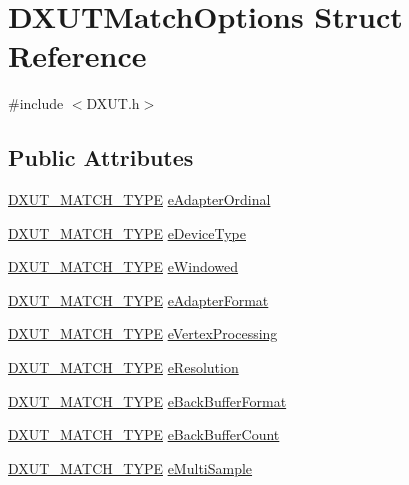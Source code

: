 \hypertarget{struct_d_x_u_t_match_options}{
\section{DXUTMatchOptions Struct Reference}
\label{struct_d_x_u_t_match_options}
}


{\ttfamily \#include $<$DXUT.h$>$}\subsection*{Public Attributes}
\begin{DoxyCompactItemize}
\item 
\hyperlink{_d_x_u_t_8h_aaa7d287a94f58c93d67a7ec6b4cb0ee3}{DXUT\_\-MATCH\_\-TYPE} \hyperlink{struct_d_x_u_t_match_options_a9b69428656c849fb6f826cef8cab5398}{eAdapterOrdinal}
\item 
\hyperlink{_d_x_u_t_8h_aaa7d287a94f58c93d67a7ec6b4cb0ee3}{DXUT\_\-MATCH\_\-TYPE} \hyperlink{struct_d_x_u_t_match_options_ae5673ce0d36d4977884ce5704a911393}{eDeviceType}
\item 
\hyperlink{_d_x_u_t_8h_aaa7d287a94f58c93d67a7ec6b4cb0ee3}{DXUT\_\-MATCH\_\-TYPE} \hyperlink{struct_d_x_u_t_match_options_a4a90a47a97650abaae05c545c9ca3c8e}{eWindowed}
\item 
\hyperlink{_d_x_u_t_8h_aaa7d287a94f58c93d67a7ec6b4cb0ee3}{DXUT\_\-MATCH\_\-TYPE} \hyperlink{struct_d_x_u_t_match_options_ac803d477036feafabca327cecc8c02e3}{eAdapterFormat}
\item 
\hyperlink{_d_x_u_t_8h_aaa7d287a94f58c93d67a7ec6b4cb0ee3}{DXUT\_\-MATCH\_\-TYPE} \hyperlink{struct_d_x_u_t_match_options_a8322f0f64497c18263cab5a04d039ffb}{eVertexProcessing}
\item 
\hyperlink{_d_x_u_t_8h_aaa7d287a94f58c93d67a7ec6b4cb0ee3}{DXUT\_\-MATCH\_\-TYPE} \hyperlink{struct_d_x_u_t_match_options_acd2bd323152531f584f35196daef968b}{eResolution}
\item 
\hyperlink{_d_x_u_t_8h_aaa7d287a94f58c93d67a7ec6b4cb0ee3}{DXUT\_\-MATCH\_\-TYPE} \hyperlink{struct_d_x_u_t_match_options_ad1a137e3bdfbdf220ef9237016f8121e}{eBackBufferFormat}
\item 
\hyperlink{_d_x_u_t_8h_aaa7d287a94f58c93d67a7ec6b4cb0ee3}{DXUT\_\-MATCH\_\-TYPE} \hyperlink{struct_d_x_u_t_match_options_a8b59d66f082be16875e2e31bb89cc74c}{eBackBufferCount}
\item 
\hyperlink{_d_x_u_t_8h_aaa7d287a94f58c93d67a7ec6b4cb0ee3}{DXUT\_\-MATCH\_\-TYPE} \hyperlink{struct_d_x_u_t_match_options_ad6500f3b47320e1bc6de0ef331305932}{eMultiSample}

\end{DoxyCompactItemize}
